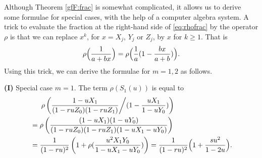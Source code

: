 \documentclass[12pt]{amsart}
\numberwithin{equation}{section}
\theoremstyle{plain}
\theoremstyle{definition}
\begin{document}
Although Theorem \ref{gfF:frac} is somewhat complicated, it allows us to derive some 
formulae for special cases, with the help of a computer algebra system.
A trick to evaluate the fraction at the right-hand side of \eqref{eq:rhofrac} by the operator $\rho$ is that we can replace $x^k$, for $x=X_j$,  $Y_j$ or $Z_j$, by $x$ for $k\geq 1$. That is
\begin{equation}\label{rho:trick}
\rho\Bigl(\frac{1}{a+bx}\Bigr) = \rho\Bigl(\frac{1}{a}(1-\frac{bx}{a+b})\Bigr).
\end{equation}
Using this trick, we can derive the formulae for $m=1,2$ as follows. 

{\bf (I)} Special case $m=1$. The term $\rho(S_1(u))$ is equal to 
\begin{align*}
	&\phantom{==}\rho\left( \frac{1-uX_1}{(1-ruZ_0)(1-ruZ_1)} \middle/ {(1- \frac{u X_1}{ 1-uY_0})} \right)  \\
	&=
	\rho\left( \frac{(1-uX_1)(1-uY_0)}{(1-ruZ_0)(1-ruZ_1) (1- u X_1-uY_0) }\right)\\
	&=
	\frac{1}{(1-ru)^2}\left(1 + \rho( \frac{u^2X_1Y_0}{1- u X_1-uY_0})\right)= \frac{1}{(1-ru)^2}
	\Bigl(1 + \frac{su^2}{ 1- 2u}\Bigr).
\end{align*}
\end{document}
